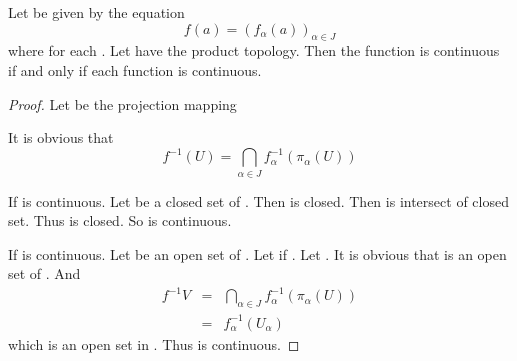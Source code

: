 \begin{theorem}
      Let  be given by the equation
      \begin{equation*}
            f(a) = (
                  f_{\alpha}(a)
            )_{\alpha \in J}
      \end{equation*}
      where  for each \mt{\alpha}. Let  have the product topology. Then the function  is continuous if and only if each function  is continuous.
\end{theorem}

\begin{proof}
      Let \mt{
            \pi_{\alpha}
      } be the projection mapping

      It is obvious that
      \begin{equation*}
            f^{-1}(U) = \bigcap_{\alpha \in J} f_{\alpha}^{-1}(\pi_{\alpha}(U))
      \end{equation*}

      If  is continuous. Let  be a closed set of . Then  is closed. Then  is intersect of closed set. Thus  is closed. So  is continuous.

      If  is continuous. Let  be an open set of . Let  if \mt{
            \beta \neq \alpha
      }. Let . It is obvious that  is an open set of . And 
      \begin{eqnarray*}
            f^{-1}{V} &=& \bigcap_{\alpha \in J} f_{\alpha}^{-1}(\pi_{\alpha}(U)) \\
            &=& f_{\alpha}^{-1}(U_{\alpha})
      \end{eqnarray*}
      which is an open set in . Thus  is continuous.
\end{proof}